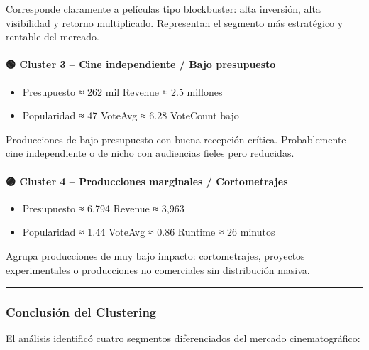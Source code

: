 \documentclass[
]{article}
\providecommand{\tightlist}{%
  \setlength{\itemsep}{0pt}\setlength{\parskip}{0pt}}
\begin{document}
Corresponde claramente a películas tipo blockbuster: alta inversión,
alta visibilidad y retorno multiplicado. Representan el segmento más
estratégico y rentable del mercado.

\paragraph{🟢 Cluster 3 -- Cine independiente / Bajo
presupuesto}\label{cluster-3-cine-independiente-bajo-presupuesto}

\begin{itemize}
\tightlist
\item
  Presupuesto ≈ 262 mil \textbar{} Revenue ≈ 2.5 millones\\
\item
  Popularidad ≈ 47 \textbar{} VoteAvg ≈ 6.28 \textbar{} VoteCount bajo
\end{itemize}

Producciones de bajo presupuesto con buena recepción crítica.
Probablemente cine independiente o de nicho con audiencias fieles pero
reducidas.

\paragraph{🟣 Cluster 4 -- Producciones marginales /
Cortometrajes}\label{cluster-4-producciones-marginales-cortometrajes}

\begin{itemize}
\tightlist
\item
  Presupuesto ≈ 6,794 \textbar{} Revenue ≈ 3,963\\
\item
  Popularidad ≈ 1.44 \textbar{} VoteAvg ≈ 0.86 \textbar{} Runtime ≈ 26
  minutos
\end{itemize}

Agrupa producciones de muy bajo impacto: cortometrajes, proyectos
experimentales o producciones no comerciales sin distribución masiva.

\begin{center}\rule{0.5\linewidth}{0.5pt}\end{center}

\subsubsection{Conclusión del
Clustering}\label{conclusiuxf3n-del-clustering}

El análisis identificó cuatro segmentos diferenciados del mercado
cinematográfico:
\end{document}
